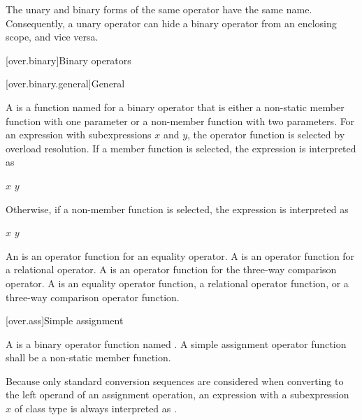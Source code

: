 \pnum
\begin{note}
The unary and binary forms of the same operator have the same name.
Consequently, a unary operator can hide a binary
operator from an enclosing scope, and vice versa.
\end{note}

[over.binary]{Binary operators}%

[over.binary.general]{General}%
%

\pnum
A 
is a function named 
for a binary operator  that is either
a non-static member function with one parameter or
a non-member function with two parameters.
%
For an expression  with subexpressions $x$ and $y$,
the operator function is selected by overload resolution.
If a member function is selected,
the expression is interpreted as
\begin{ncsimplebnf}
$x$    \terminal{(} $y$ \terminal{)}
\end{ncsimplebnf}
Otherwise, if a non-member function is selected,
the expression is interpreted as
\begin{ncsimplebnf}
  \terminal{(} $x$ \terminal{,} $y$ \terminal{)}
\end{ncsimplebnf}

\pnum
An  is an operator function
for an equality operator.
A  is an operator function
for a relational operator.
A  is an operator function
for the three-way comparison operator.
A  is
an equality operator function,
a relational operator function, or
a three-way comparison operator function.

[over.ass]{Simple assignment}
%

\pnum
A 
is a binary operator function named .
A simple assignment operator function shall be a non-static member function.
\begin{note}
Because only standard conversion sequences are considered when converting
to the left operand of an assignment operation,
an expression  with a subexpression $x$ of class type
is always interpreted as .
\end{note}

